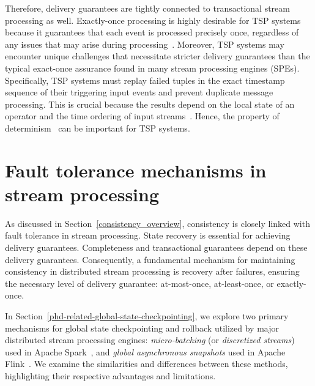 Therefore, delivery guarantees are tightly connected to transactional stream processing as well. Exactly-once processing is highly desirable for TSP systems because it guarantees that each event is processed precisely once, regardless of any issues that may arise during processing~\cite{zhang2024survey}. Moreover, TSP systems may encounter unique challenges that necessitate stricter delivery guarantees than the typical exact-once assurance found in many stream processing engines (SPEs). Specifically, TSP systems must replay failed tuples in the exact timestamp sequence of their triggering input events and prevent duplicate message processing. This is crucial because the results depend on the local state of an operator and the time ordering of input streams~\cite{zhang2024survey}. Hence, the property of determinism~\cite{thepaper, Zacheilas:2017:MDS:3093742.3093921, palyvos2022research} can be important for TSP systems.


\section{Fault tolerance mechanisms in stream processing}
\label{phd-related-fault-tolerance}

As discussed in Section~\ref{consistency_overview}, consistency is closely linked with fault tolerance in stream processing. State recovery is essential for achieving delivery guarantees. Completeness and transactional guarantees depend on these delivery guarantees. Consequently, a fundamental mechanism for maintaining consistency in distributed stream processing is recovery after failures, ensuring the necessary level of delivery guarantee: at-most-once, at-least-once, or exactly-once.

In Section~\ref{phd-related-global-state-checkpointing}, we explore two primary mechanisms for global state checkpointing and rollback utilized by major distributed stream processing engines: {\em micro-batching} (or {\em discretized streams}) used in Apache Spark~\cite{Zaharia:2012:DSE:2342763.2342773}, and {\em global asynchronous snapshots} used in Apache Flink~\cite{2015arXiv150608603C, Carbone:2017:SMA:3137765.3137777}. We examine the similarities and differences between these methods, highlighting their respective advantages and limitations.

